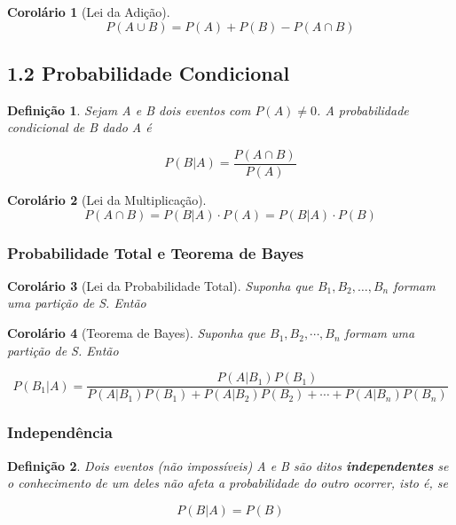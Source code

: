 \documentclass[12pt]{article}
\newtheorem{corollary}{Corolário}[theorem]
\newtheorem{definition}{Definição}
\begin{document}
\begin{corollary}[Lei da Adição]
$$P(A \cup B) = P(A) + P(B) - P(A \cap B)$$
\end{corollary}

\subsection*{1.2 Probabilidade Condicional}
\label{s3}

\begin{definition}
Sejam A e B dois eventos com $P(A) \neq 0$. A probabilidade condicional de B dado A é

$$P(B|A) = \dfrac{P(A \cap B)}{P(A)}$$
\end{definition}

\begin{corollary}[Lei da Multiplicação]

$$P(A \cap B) = P(B|A) \cdot P(A) = P(B|A) \cdot P(B)$$

\end{corollary}

\subsubsection*{Probabilidade Total e Teorema de Bayes}
\begin{corollary}[Lei da Probabilidade Total]
Suponha que $B_1, B_2, \dots, B_n$ formam uma partição de S. Então


\end{corollary}

\begin{corollary}[Teorema de Bayes]
Suponha que $B_1, B_2, \cdots, B_n$ formam uma partição de S. Então

$$P(B_1|A) = \dfrac{P(A|B_1) P(B_1)}{P(A|B_1) P(B_1) + P(A|B_2) P(B_2) + \cdots + P(A|B_n) P(B_n)}$$

\end{corollary}

\subsubsection*{Independência}
\begin{definition}
Dois eventos (não impossíveis) A e B são ditos \textbf{independentes} se o conhecimento de um deles não afeta a probabilidade do outro ocorrer, isto é, se

$$P(B|A) = P(B)$$
\end{definition}
\end{document}
